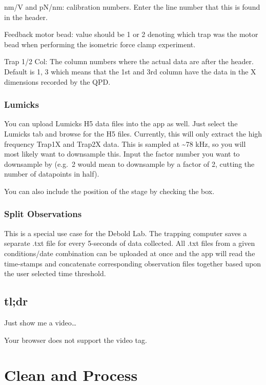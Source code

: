 \documentclass[
]{book}
\begin{document}
nm/V and pN/nm: calibration numbers. Enter the line number that this is found in the header.

Feedback motor bead: value should be 1 or 2 denoting which trap was the motor bead when performing the isometric force clamp experiment.

Trap 1/2 Col: The column numbers where the actual data are after the header. Default is 1, 3 which means that the 1st and 3rd column have the data in the X dimensions recorded by the QPD.

\subsection{Lumicks}\label{lumicks}

You can upload Lumicks H5 data files into the app as well. Just select the Lumicks tab and browse for the H5 files. Currently, this will only extract the high frequency Trap1X and Trap2X data. This is sampled at \textasciitilde78 kHz, so you will most likely want to downsample this. Input the factor number you want to downsample by (e.g.~2 would mean to downsample by a factor of 2, cutting the number of datapoints in half).

You can also include the position of the stage by checking the box.

\subsection{Split Observations}\label{split-observations}

This is a special use case for the Debold Lab. The trapping computer saves a separate .txt file for every 5-seconds of data collected. All .txt files from a given conditions/date combination can be uploaded at once and the app will read the time-stamps and concatenate corresponding observation files together based upon the user selected time threshold.

\section{tl;dr}\label{tldr}

Just show me a video\ldots{}

Your browser does not support the video tag.

\chapter{Clean and Process}\label{clean-and-process}
\end{document}
